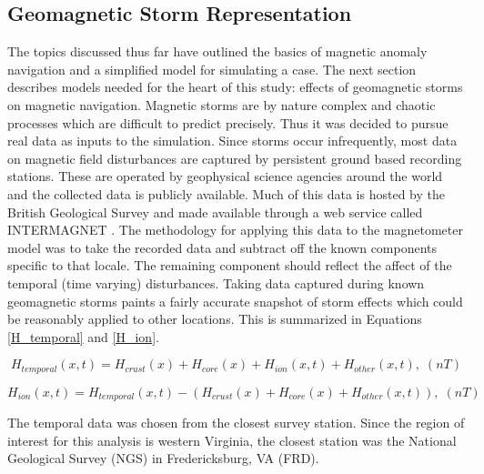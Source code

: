 \documentclass[conf]{new-aiaa}
\begin{document}

\subsection{Geomagnetic Storm Representation} \label{geostorm_rep} %

The topics discussed thus far have outlined the basics of magnetic anomaly navigation and a simplified model for simulating a case. The next section describes models needed for the heart of this study: effects of geomagnetic storms on magnetic navigation. Magnetic storms are by nature complex and chaotic processes which are difficult to predict precisely. Thus it was decided to pursue real data as inputs to the simulation. Since storms occur infrequently, most data on magnetic field disturbances are captured by persistent ground based recording stations. These are operated by geophysical science agencies around the world and the collected data is publicly available. Much of this data is hosted by the British Geological Survey and made available through a web service called INTERMAGNET \cite{intramagnet}. The methodology for applying this data to the magnetometer model was to take the recorded data and subtract off the known components specific to that locale. The remaining component should reflect the affect of the temporal (time varying) disturbances. Taking data captured during known geomagnetic storms paints a fairly accurate snapshot of storm effects which could be reasonably applied to other locations. This is summarized in Equations \ref{H_temporal} and \ref{H_ion}.

\begin{equation} \label{H_temporal}
    H_{temporal}(x, t) = H_{crust}(x) + H_{core}(x) + H_{ion}(x, t) + H_{other}(x, t), \; (nT)
\end{equation}

\begin{equation} \label{H_ion}
    H_{ion}(x, t) = H_{temporal}(x, t) - (H_{crust}(x) + H_{core}(x) + H_{other}(x, t)), \; (nT)
\end{equation}

The temporal data was chosen from the closest survey station. Since the region of interest for this analysis is western Virginia, the closest station was the National Geological Survey (NGS) in Fredericksburg, VA (FRD). 
\end{document}
